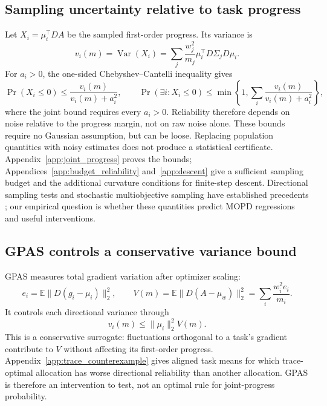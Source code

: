 \subsection{Sampling uncertainty relative to task progress}

Let $X_i=\mu_i^\top DA$ be the sampled first-order progress. Its variance is
\begin{equation}
    v_i(m)=\operatorname{Var}(X_i)
      =\sum_j\frac{w_j^2}{m_j}
          \mu_i^\top D\Sigma_jD\mu_i.
    \label{eq:directional_variance}
\end{equation}
For $a_i>0$, the one-sided Chebyshev--Cantelli inequality gives
\begin{equation}
    \Pr(X_i\leq0)\leq\frac{v_i(m)}{v_i(m)+a_i^2},\qquad
    \Pr(\exists i:X_i\leq0)
      \leq\min\!\left\{1,\sum_i\frac{v_i(m)}{v_i(m)+a_i^2}\right\},
    \label{eq:directional_reliability}
\end{equation}
where the joint bound requires every $a_i>0$. Reliability therefore
depends on noise relative to the progress margin, not on raw noise alone.
These bounds require no Gaussian assumption, but can be loose. Replacing
population quantities with noisy estimates does not produce a statistical
certificate. Appendix~\ref{app:joint_progress} proves the bounds;
Appendices~\ref{app:budget_reliability} and~\ref{app:descent} give a
sufficient sampling budget and the additional curvature conditions for
finite-step descent. Directional sampling tests and stochastic
multiobjective sampling have established precedents
\citep{bollapragada2018adaptive,zhao2024adaptive}; our empirical question
is whether these quantities predict MOPD regressions and useful interventions.

\subsection{GPAS controls a conservative variance bound}

GPAS measures total gradient variation after optimizer scaling:
\begin{equation}
    e_i=\mathbb E\|D(g_i-\mu_i)\|_2^2,\qquad
    V(m)=\mathbb E\|D(A-\mu_w)\|_2^2
         =\sum_i\frac{w_i^2e_i}{m_i}.
    \label{eq:batch_variance}
\end{equation}
It controls each directional variance through
\begin{equation}
    v_i(m)\leq\|\mu_i\|_2^2 V(m).
    \label{eq:trace_directional_bound}
\end{equation}
This is a conservative surrogate: fluctuations orthogonal to a task's
gradient contribute to $V$ without affecting its first-order progress.
Appendix~\ref{app:trace_counterexample} gives aligned task means for
which trace-optimal allocation has worse directional reliability than
another allocation. GPAS is therefore an intervention to test, not an
optimal rule for joint-progress probability.

